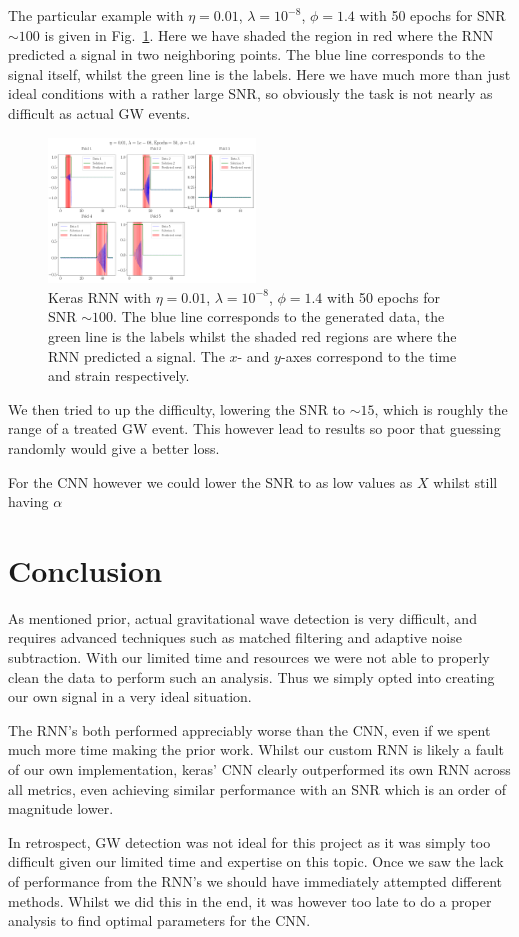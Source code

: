 \documentclass[%
reprint,
amsmath,amssymb,
aps,
]{revtex4-2}
\begin{document}
The particular example with $\eta=0.01$, $\lambda=10^{-8}$, $\phi=1.4$ with 50 epochs for SNR $\sim100$ is given in Fig.~\ref{fig:bestPred}. Here we have shaded the region in red where the RNN predicted a signal in two neighboring points. The blue line corresponds to the signal itself, whilst the green line is the labels. Here we have much more than just ideal conditions with a rather large SNR, so obviously the task is not nearly as difficult as actual GW events. 
\begin{figure}
	\includegraphics[width=0.49\textwidth]{Figures/BestPrediction_Epochs50_Phi1.4.pdf}
	\caption{Keras RNN with $\eta=0.01$, $\lambda=10^{-8}$, $\phi=1.4$ with 50 epochs for SNR $\sim100$. The blue line corresponds to the generated data, the green line is the labels whilst the shaded red regions are where the RNN predicted a signal. The $x$- and $y$-axes correspond to the time and strain respectively.}
	\label{fig:bestPred}
\end{figure}

We then tried to up the difficulty, lowering the SNR to $\sim15$, which is roughly the range of a treated GW event. This however lead to results so poor that guessing randomly would give a better loss. 

For the CNN however we could lower the SNR to as low values as $X$ whilst still having $\alpha$


\section{Conclusion}
As mentioned prior, actual gravitational wave detection is very difficult, and requires advanced techniques such as matched filtering and adaptive noise subtraction. With our limited time and resources we were not able to properly clean the data to perform such an analysis. Thus we simply opted into creating our own signal in a very ideal situation. 

The RNN's both performed appreciably worse than the CNN, even if we spent much more time making the prior work. Whilst our custom RNN is likely a fault of our own implementation, keras' CNN clearly outperformed its own RNN across all metrics, even achieving similar performance with an SNR which is an order of magnitude lower.

In retrospect, GW detection was not ideal for this project as it was simply too difficult given our limited time and expertise on this topic. Once we saw the lack of performance from the RNN's we should have immediately attempted different methods. Whilst we did this in the end, it was however too late to do a proper analysis to find optimal parameters for the CNN.



	
\end{document}
